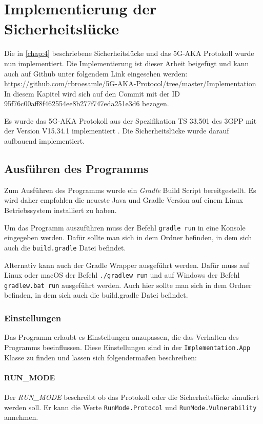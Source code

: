 \chapter{Implementierung der Sicherheitsl\"ucke}
\label{chap:5}

Die in \cref{chap:4} beschriebene Sicherheitslücke und das 5G-AKA Protokoll wurde nun implementiert.
Die Implementierung ist dieser Arbeit beigefügt und kann auch auf Github unter folgendem Link eingesehen werden: \url{https://github.com/rbroesamle/5G-AKA-Protocol/tree/master/Implementation}
In diesem Kapitel wird sich auf den Commit mit der ID 95f76c00aff8f462554ee8b277f747eda251e3d6 bezogen.

Es wurde das 5G-AKA Protokoll aus der Spezifikation TS 33.501 des 3GPP mit der Version V15.34.1 implementiert \cite{3gppTS33.501V15.34.1}.
Die Sicherheitslücke wurde darauf aufbauend implementiert.


\section{Ausführen des Programms}
Zum Ausführen des Programms wurde ein \textit{Gradle} Build Script bereitgestellt.
Es wird daher empfohlen die neueste Java und Gradle Version auf einem Linux Betriebssystem installiert zu haben.

Um das Programm auszuführen muss der Befehl \lstinline{gradle run} in eine Konsole eingegeben werden.
Dafür sollte man sich in dem Ordner befinden, in dem sich auch die \lstinline{build.gradle} Datei befindet.

Alternativ kann auch der Gradle Wrapper ausgeführt werden.
Dafür muss auf Linux oder macOS der Befehl \lstinline{./gradlew run} und auf Windows der Befehl \lstinline{gradlew.bat run} ausgeführt werden.
Auch hier sollte man sich in dem Ordner befinden, in dem sich auch die build.gradle Datei befindet.

\subsection{Einstellungen}

Das Programm erlaubt es Einstellungen anzupassen, die das Verhalten des Programms beeinflussen.
Diese Einstellungen sind in der \lstinline{Implementation.App} Klasse zu finden und lassen sich folgendermaßen beschreiben:

\subsubsection{RUN\_MODE}
Der \textit{RUN\_MODE} beschreibt ob das Protokoll oder die Sicherheitslücke simuliert werden soll.
Er kann die Werte \lstinline{RunMode.Protocol} und \lstinline{RunMode.Vulnerability} annehmen.

